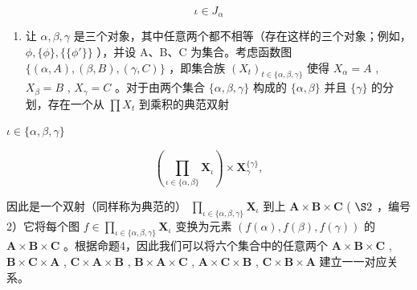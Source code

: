 \[
\iota \in J _ {\alpha}
\]

\begin{enumerate}
\def\labelenumi{(\arabic{enumi})}
\setcounter{enumi}{1}
\tightlist
\item
  让 \(\alpha, \beta, \gamma\) 是三个对象，其中任意两个都不相等（存在这样的三个对象；例如， \(\phi, \{\phi\}, \{\{\phi'\}\}\) ），并设 A、B、C 为集合。考虑函数图 \(\{(\alpha, A), (\beta, B), (\gamma, C)\}\) ，即集合族 \((X_{t})_{t \in \{\alpha, \beta, \gamma\}}\) 使得 \(X_{\alpha} = A\) , \(X_{\beta} = B\) , \(X_{\gamma} = C\) 。对于由两个集合 \(\{\alpha, \beta, \gamma\}\) 构成的 \(\{\alpha, \beta\}\) 并且 \(\{\gamma\}\) 的分划，存在一个从 \(\prod X_{t}\) 到乘积的典范双射
\end{enumerate}

\(\iota \in \{\alpha, \beta, \gamma\}\)

\[
\left(\prod_ {\iota \in \{\alpha , \beta \}} \mathbf {X} _ {\iota}\right) \times \mathbf {X} _ {\gamma} ^ {\{\gamma \}},
\]

因此是一个双射（同样称为典范的） \(\prod_{\iota \in \{\alpha, \beta, \gamma\}} \mathbf{X}_{\iota}\) 到上 \(\mathbf{A} \times \mathbf{B} \times \mathbf{C}\) ( \(\S 2\) ，编号2）它将每个图 \(f \in \prod_{\iota \in \{\alpha, \beta, \gamma\}} \mathbf{X}_{\iota}\) 变换为元素 \((f(\alpha), f(\beta), f(\gamma))\) 的 \(\mathbf{A} \times \mathbf{B} \times \mathbf{C}\) 。根据命题4，因此我们可以将六个集合中的任意两个 \(\mathbf{A} \times \mathbf{B} \times \mathbf{C}\) , \(\mathbf{B} \times \mathbf{C} \times \mathbf{A}\) , \(\mathbf{C} \times \mathbf{A} \times \mathbf{B}\) , \(\mathbf{B} \times \mathbf{A} \times \mathbf{C}\) , \(\mathbf{A} \times \mathbf{C} \times \mathbf{B}\) , \(\mathbf{C} \times \mathbf{B} \times \mathbf{A}\) 建立一一对应关系。

